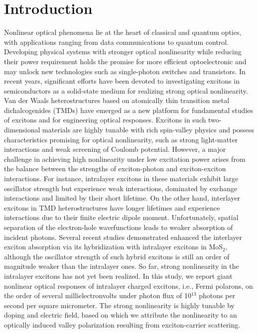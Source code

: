\section{Introduction}
Nonlinear optical phenomena lie at the heart of classical and quantum optics, with applications ranging from data communications to quantum control\cite{Volz2012-pb,Boyd2020-re}. 
Developing physical systems with stronger optical nonlinearity while reducing their power requirement holds the promise for more efficient optoelectronic and may unlock new technologies such as single-photon switches and transistors\cite{Zasedatelev2021-gh,Chang2007-lw,Sun2018-bo}. 
In recent years, significant efforts have been devoted to investigating excitons in semiconductors as a solid-state medium for realizing strong optical nonlinearity\cite{Datta2022-po,Delteil2019-pp,Munoz-Matutano2019-cg}.
Van der Waals heterostructures based on atomically thin transition metal dichalcogenides (TMDs) have emerged as a new platform for fundamental studies of excitons and for engineering optical responses\cite{Mak2018-sb,Wilson2021-ey}. 
Excitons in such two-dimensional materials are highly tunable with rich spin-valley physics and possess characteristics promising for optical nonlinearity, such as strong light-matter interactions and weak screening of Coulomb potential\cite{Wilson2021-ey}. 
However, a major challenge in achieving high nonlinearity under low excitation power arises from the balance between the strengths of exciton-photon and exciton-exciton interactions\cite{Wild2018-ee,Liu2015-hm,Barachati2018-ns}. 
For instance, intralayer excitons in these materials exhibit large oscillator strength but experience weak interactions, dominated by exchange interactions and limited by their short lifetime\cite{Regan2022-ch}. 
On the other hand, interlayer excitons in TMD heterostructures have longer lifetimes and experience interactions due to their finite electric dipole moment\cite{Zhang2019-df,Rivera2016-wg}. 
Unfortunately, spatial separation of the electron-hole wavefunctions leads to weaker absorption of incident photons. 
Several recent studies demonstrated enhanced the interlayer exciton absorption via its hybridization with intralayer excitons in MoS$_2$,\cite{Datta2022-po,Walther2018-jp,Leisgang2020-mn,Louca2023-in} although the oscillator strength of such hybrid excitons is still an order of magnitude weaker than the intralayer ones. 
So far, strong nonlinearity in the intralayer excitons has not yet been realized.
In this study, we report giant nonlinear optical responses of intralayer charged excitons, i.e., Fermi polarons, on the order of several millielectronvolts under photon flux of 10$^{13}$ photons per second per square micrometer. 
The strong nonlinearity is highly tunable by doping and electric field, based on which we attribute the nonlinearity to an optically induced valley polarization resulting from exciton-carrier scattering.

